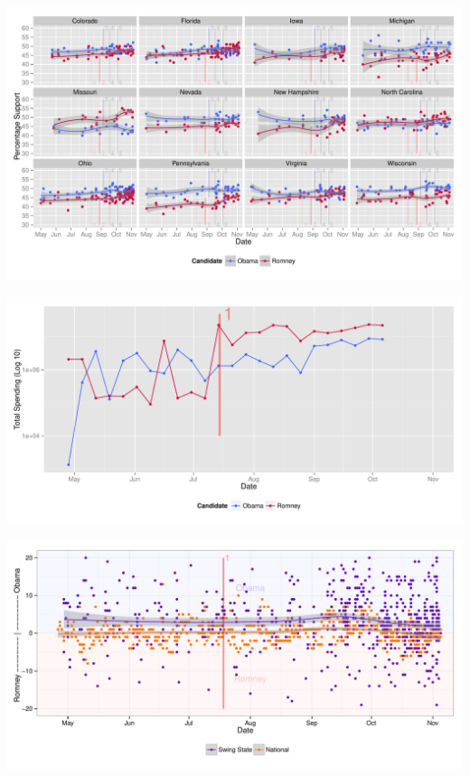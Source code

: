 \documentclass[11pt]{article}\usepackage{graphicx, color}
\newenvironment{knitrout}{}{} %
\begin{document}
\begin{knitrout}
\color{fgcolor}

{\centering \includegraphics[width=\textwidth]{figure/type_swing_1} 

}


\end{knitrout}



\begin{knitrout}
\color{fgcolor}

{\centering \includegraphics[width=\textwidth]{figure/trend_plot} 

}


\end{knitrout}

\begin{knitrout}
\color{fgcolor}

{\centering \includegraphics[width=\textwidth]{figure/effect_plot} 

}


\end{knitrout}
\end{document}
